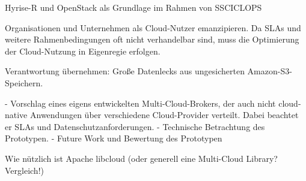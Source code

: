 Hyrise-R und OpenStack als Grundlage im Rahmen von SSCICLOPS

Organisationen und Unternehmen als Cloud-Nutzer emanzipieren. Da SLAs und weitere Rahmenbedingungen oft nicht verhandelbar sind, muss die Optimierung der Cloud-Nutzung in Eigenregie erfolgen.

Verantwortung übernehmen: Große Datenlecks aus ungesicherten Amazon-S3-Speichern.

- Vorschlag eines eigens entwickelten Multi-Cloud-Brokers, der auch nicht cloud-native Anwendungen über verschiedene Cloud-Provider verteilt. Dabei beachtet er SLAs und Datenschutzanforderungen.
- Technische Betrachtung des Prototypen.
- Future Work und Bewertung des Prototypen

Wie nützlich ist Apache libcloud (oder generell eine Multi-Cloud Library? Vergleich!)